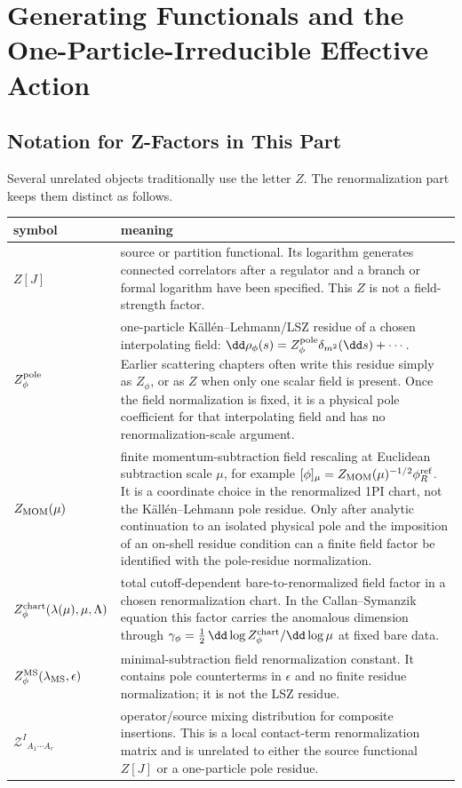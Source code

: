 \chapter{Generating Functionals and the One-Particle-Irreducible Effective Action}
\label{ch:volume-ii-generating-functionals-1pi}
\ConventionsMixed

\section*{Notation for Z-Factors in This Part}

Several unrelated objects traditionally use the letter \(Z\).  The
renormalization part keeps them distinct as follows.
\begin{center}
\renewcommand{\arraystretch}{1.25}
\begin{tabular}{>{\raggedright\arraybackslash}p{}|p{}}
symbol & meaning \\
\hline
\(Z[J]\) &
source or partition functional.  Its logarithm generates connected
correlators after a regulator and a branch or formal logarithm have been
specified.  This \(Z\) is not a field-strength factor. \\
\(Z_\phi^{\rm pole}\) &
one-particle K\"all\'en--Lehmann/LSZ residue of a chosen interpolating field:
\(\dd\rho_\phi(s)=Z_\phi^{\rm pole}\delta_{m^2}(\dd s)+\cdots\).  Earlier
scattering chapters often write this residue simply as \(Z_\phi\), or as
\(Z\) when only one scalar field is present.  Once the field normalization is
fixed, it is a physical pole coefficient for that interpolating field and has
no renormalization-scale argument. \\
\(Z_{\rm MOM}(\mu)\) &
finite momentum-subtraction field rescaling at Euclidean subtraction scale
\(\mu\), for example
\([\phi]_\mu=Z_{\rm MOM}(\mu)^{-1/2}\phi_R^{\rm ref}\).  It is a coordinate
choice in the renormalized 1PI chart, not the K\"all\'en--Lehmann pole
residue.  Only after analytic continuation to an isolated physical pole and
the imposition of an on-shell residue condition can a finite field factor be
identified with the pole-residue normalization. \\
\(Z_\phi^{\rm chart}(\lambda(\mu),\mu,\Lambda)\) &
total cutoff-dependent bare-to-renormalized field factor in a chosen
renormalization chart.  In the Callan--Symanzik equation this factor carries
the anomalous dimension through
\(\gamma_\phi=\frac12\,\dd\log Z_\phi^{\rm chart}/\dd\log\mu\) at fixed bare
data. \\
\(Z_\phi^{\rm MS}(\lambda_{\rm MS},\epsilon)\) &
minimal-subtraction field renormalization constant.  It contains pole
counterterms in \(\epsilon\) and no finite residue normalization; it is not the
LSZ residue. \\
\(\mathcal Z^I{}_{A_1\cdots A_r}\) &
operator/source mixing distribution for composite insertions.  This is a
local contact-term renormalization matrix and is unrelated to either the
source functional \(Z[J]\) or a one-particle pole residue.
\end{tabular}
\end{center}
